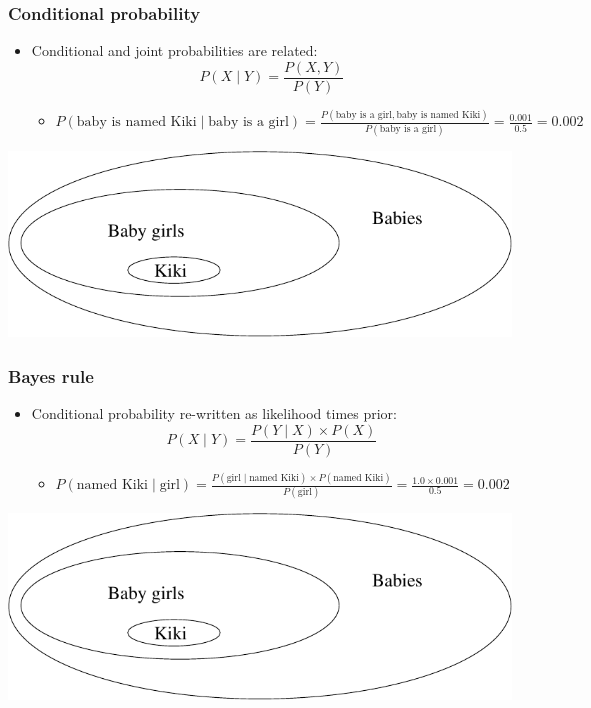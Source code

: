 \documentclass[handout]{beamer}
\begin{document}
\begin{frame}
\frametitle{Conditional probability}
\begin{itemize}[<+->]
\item Conditional and joint probabilities are related:
\[ P(X \mid Y) = \frac{P(X,Y)}{P(Y)} \]

\begin{itemize}[<+->]
\item $P(\mbox{baby is named Kiki} \mid \mbox{baby is a girl}) =
  \frac{P(\mbox{baby is a girl}, \mbox{baby is named Kiki})}{P(\mbox{baby is
    a girl})} = \frac{0.001}{0.5} = 0.002 $
\end{itemize}
\end{itemize}
\includegraphics[scale=.8]{figures/prob-fig1}

\end{frame}

\begin{frame}
\frametitle{Bayes rule}
\begin{itemize}[<+->]
\item Conditional probability re-written as likelihood times prior:
\[ P(X \mid Y) = \frac{P(Y \mid X) \times P(X)}{P(Y)} \]

\begin{itemize}[<+->]
\item $P(\mbox{named Kiki} \mid \mbox{girl}) =
  \frac{P(\mbox{girl} \mid \mbox{named Kiki}) \times P(\mbox{named
  Kiki})}{P(\mbox{girl})} = \frac{1.0 \times 0.001}{0.5} = 0.002$
\end{itemize}
\end{itemize}
\includegraphics[scale=.8]{figures/prob-fig1}

\end{frame}
\end{document}

